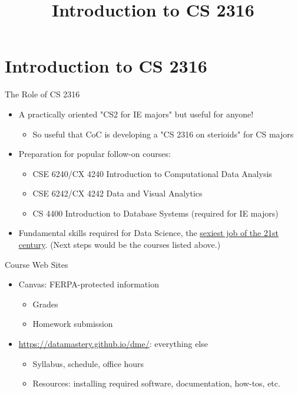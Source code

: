 \documentclass[smaller]{beamer}
\author{}
\date{}
\title{Introduction to CS 2316}
\begin{document}
\maketitle

\section{Introduction to CS 2316}
\label{sec-1}

\begin{frame}[label=sec-1-1]{The Role of CS 2316}
\begin{itemize}
\item A practically oriented "CS2 for IE majors" but useful for anyone!

\begin{itemize}
\item So useful that CoC is developing a "CS 2316 on sterioids" for CS majors
\end{itemize}

\item Preparation for popular follow-on courses:

\begin{itemize}
\item CSE 6240/CX 4240 Introduction to Computational Data Analysis
\item CSE 6242/CX 4242 Data and Visual Analytics
\item CS 4400 Introduction to Database Systems (required for IE majors)
\end{itemize}

\item Fundamental skills required for Data Science, the \href{https://hbr.org/2012/10/data-scientist-the-sexiest-job-of-the-21st-century}{sexiest job of the 21st century}. (Next steps would be the courses listed above.)
\end{itemize}
\end{frame}

\begin{frame}[label=sec-1-2]{Course Web Sites}
\begin{itemize}
\item Canvas: FERPA-protected information

\begin{itemize}
\item Grades
\item Homework submission
\end{itemize}

\item \href{https://datamastery.github.io/dme/}{\url{https://datamastery.github.io/dme/}}: everything else

\begin{itemize}
\item Syllabus, schedule, office hours
\item Resources: installing required software, documentation, how-tos, etc.
\end{itemize}
\end{itemize}
\end{frame}
\end{document}
